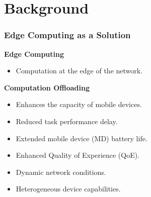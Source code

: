 \section{Background}

\begin{frame}
	\frametitle{Edge Computing as a Solution}
	
	
	\textbf{Edge Computing}
	
	\begin{itemize}
		
		\item Computation at the edge of the network. 
	\end{itemize}
	
	
	
	\textbf{Computation Offloading}
	
	\begin{itemize}
		
		\item Enhances the capacity of mobile devices.
	\end{itemize}
	
	
	
	\vfill
	
	
	\begin{itemize}
		
		\item Reduced task performance delay.
		\item Extended mobile device (MD) battery life.
		\item Enhanced Quality of Experience (QoE).
	\end{itemize}
	
	\vspace{3mm}
	
	\vspace{1mm}
	
	
	
	\begin{itemize}
		\item Dynamic network conditions.
		\item Heterogeneous device capabilities.
	\end{itemize}
	
\end{frame}

